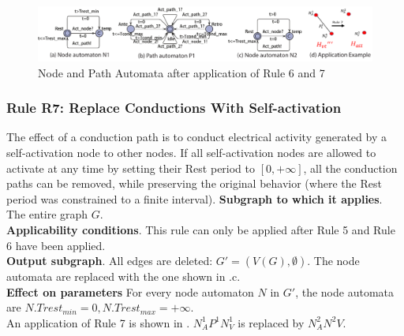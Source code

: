 \begin{figure}[!t]
	\centering
	\includegraphics[width=1.05\textwidth]{figs/rule5.pdf}
	\caption{\small Node and Path Automata after application of Rule 6 and 7}
	\vspace{-10pt}
	\label{fig:rule5}
\end{figure}

\subsubsection{Rule R7: Replace Conductions With Self-activation}
The effect of a conduction path is to conduct electrical activity generated by a self-activation node to other nodes. 
If all self-activation nodes are allowed to activate at any time by setting their Rest period to $[0,+\infty]$, all the conduction paths can be removed, while preserving the original behavior (where the Rest period was constrained to a finite interval).
\textbf{Subgraph to which it applies}.
The entire graph $G$.\\
\textbf{Applicability conditions}.
This rule can only be applied after Rule 5 and Rule 6 have been applied.\\
\textbf{Output subgraph}.
All edges are deleted: $G' = (V(G), \emptyset)$. The node automata are replaced with the one shown in .c.\\
\textbf{Effect on parameters}
For every node automaton $N$ in $G'$, the node automata are $N.Trest_{min}=0,N.Trest_{max} = +\infty$.\\

An application of Rule 7 is shown in . $N^1_AP^1N^1_V$ is replaced by $N^2_AN^2V$.


%




